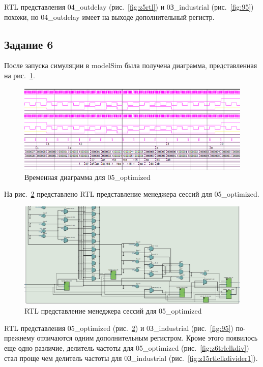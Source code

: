 \documentclass[a4paper,14pt]{article}
\begin{document}
	RTL представления 04\_outdelay (рис.~\ref{fig:z5rtl}) и  0З\_industrial (рис.~\ref{fig:95}) похожи, но 04\_outdelay имеет на выходе дополнительный регистр.
	
	\subsection{Задание 6}
	
	После запуска симуляции в modelSim была получена диаграмма, представленная на рис.~\ref{fig:z6msimwvf}.
	
	\begin{figure}[H]
		\centering
		\includegraphics[width=0.9\linewidth]{images/z6_msim_wvf}
		\caption{Временная диаграмма для 05\_optimized}
		\label{fig:z6msimwvf}
	\end{figure}
	
	На рис.~\ref{fig:z6rtl} представлено RTL представление менеджера сессий для 05\_optimized.
	
	\begin{figure}[H]
		\centering
		\includegraphics[width=0.9\linewidth]{images/z6_rtl}
		\caption{RTL представление менеджера сессий для 05\_optimized}
		\label{fig:z6rtl}
	\end{figure}
	
	RTL представления 05\_optimized (рис.~\ref{fig:z6rtl}) и  0З\_industrial (рис.~\ref{fig:95}) по-прежнему отличаются одним дополнительным регистром.
	Кроме этого появилось еще одно различие, делитель частоты для 05\_optimized (рис.~\ref{fig:z6trlclkdiv}) стал проще чем делитель частоты для 0З\_industrial (рис.~\ref{fig:z15rtlclkdivider1}).
	
\end{document}
